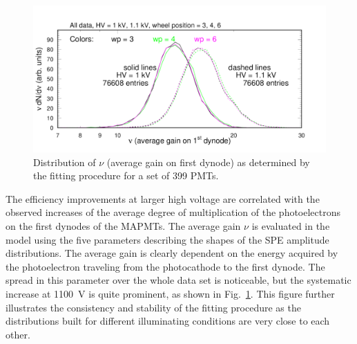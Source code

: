\begin{figure}[h!]
	\centering
	\includegraphics[width=0.98\linewidth, trim=0 12 50 35,clip]{figures/pglobal_nu.pdf}
	\caption{Distribution of $\nu$ (average gain on first dynode) as determined by the fitting procedure for a set of 399 PMTs.}
	\label{fig:pglobal_nu}
\end{figure}
The efficiency improvements at larger high voltage are correlated with the observed increases of the average degree of multiplication of the photoelectrons on the first dynodes of the MAPMTs. The average gain $\nu$ is evaluated in the model using the five parameters describing the shapes of the SPE amplitude distributions. The average gain is clearly dependent on the energy acquired by the photoelectron traveling from the photocathode to the first dynode. The spread in this parameter over the whole data set is noticeable, but the systematic increase at 1100~V is quite prominent, as shown in Fig.~\ref{fig:pglobal_nu}. This figure further illustrates the consistency and stability of the fitting procedure as the distributions built for different illuminating conditions are very close to each other.

